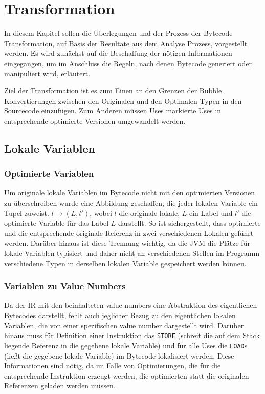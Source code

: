 \chapter{Transformation}
\label{ch:trans}

In diesem Kapitel sollen die Überlegungen und der Prozess der Bytecode Transformation,
auf Basis der Resultate aus dem Analyse Prozess, vorgestellt werden. Es wird zunächst 
auf die Beschaffung der nötigen Informationen eingegangen, um im Anschluss die Regeln,
nach denen Bytecode generiert oder manipuliert wird, erläutert.

Ziel der Transformation ist es zum Einen an den Grenzen der Bubble Konvertierungen zwischen den
Originalen und den Optimalen Typen in den Sourcecode einzufügen. Zum Anderen müssen Uses
markierte Uses in entsprechende optimierte Versionen umgewandelt werden.  

\section{Lokale Variablen}
\label{sec:locals}

\subsection{Optimierte Variablen}

Um originale lokale Variablen im Bytecode nicht mit den optimierten Versionen zu 
überschreiben wurde eine Abbildung geschaffen, die jeder lokalen Variable ein Tupel 
zuweist. $l \rightarrow (L,l')$, wobei $l$ die originale lokale, $L$ ein Label und 
$l'$ die optimierte Variable für das Label $L$ darstellt. So ist sichergestellt, dass
optimierte und die entsprechende originale Referenz in zwei verschiedenen Lokalen 
geführt werden. Darüber hinaus ist diese Trennung wichtig, da die JVM die Plätze für
lokale Variablen typisiert und daher nicht an verschiedenen Stellen im Programm 
verschiedene Typen in derselben lokalen Variable gespeichert werden können.

\subsection{Variablen zu Value Numbers}

Da der IR mit den beinhalteten value numbers eine Abstraktion des eigentlichen Bytecodes
darstellt, fehlt auch jeglicher Bezug zu den eigentlichen lokalen Variablen, die von
einer spezifischen value number dargestellt wird. Darüber hinaus muss für Definition
einer Instruktion das \texttt{STORE} (schreit die auf dem Stack liegende Referenz in 
die gegebene lokale Variable) und für alle Uses die \texttt{LOAD}s (ließt die 
gegebene lokale Variable) im Bytecode lokalisiert werden. Diese Informationen sind nötig,
da im Falle von Optimierungen, die für die entsprechende Instruktion erzeugt werden, 
die optimierten statt die originalen Referenzen geladen werden müssen.

